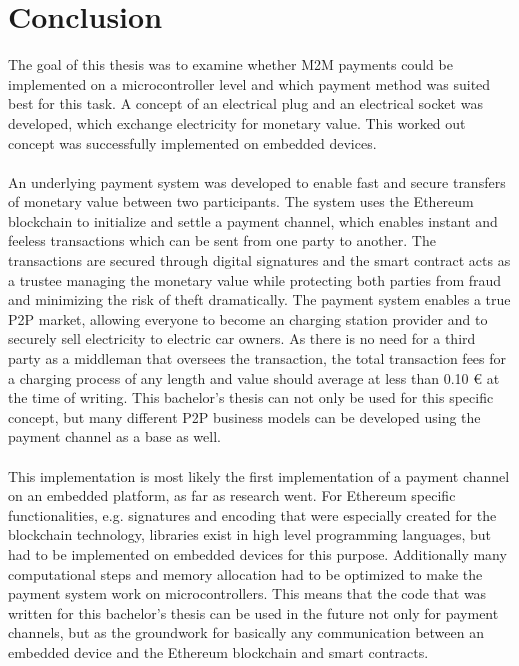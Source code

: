 \section{Conclusion}
The goal of this thesis was to examine whether M2M payments could be implemented on a microcontroller level and which payment method was suited best for this task.
A concept of an electrical plug and an electrical socket was developed, which exchange electricity for monetary value.
This worked out concept was successfully implemented on embedded devices.
\\\\
An underlying payment system was developed to enable fast and secure transfers of monetary value between two participants.
The system uses the Ethereum blockchain to initialize and settle a payment channel, which enables instant and feeless transactions which can be sent from one party to another.
The transactions are secured through digital signatures and the smart contract acts as a trustee managing the monetary value while protecting both parties from fraud and minimizing the risk of theft dramatically.
The payment system enables a true P2P market, allowing everyone to become an charging station provider and to securely sell electricity to electric car owners.
As there is no need for a third party as a middleman that oversees the transaction, the total transaction fees for a charging process of any length and value should average at less than 0.10 \euro{} at the time of writing.
This bachelor's thesis can not only be used for this specific concept, but many different P2P business models can be developed using the payment channel as a base as well.
\\\\
This implementation is most likely the first implementation of a payment channel on an embedded platform, as far as research went.
For Ethereum specific functionalities, e.g. signatures and encoding that were especially created for the blockchain technology, libraries exist in high level programming languages, but had to be implemented on embedded devices for this purpose.
Additionally many computational steps and memory allocation had to be optimized to make the payment system work on microcontrollers.
This means that the code that was written for this bachelor's thesis can be used in the future not only for payment channels, but as the groundwork for basically any communication between an embedded device and the Ethereum blockchain and smart contracts.
\\\\
